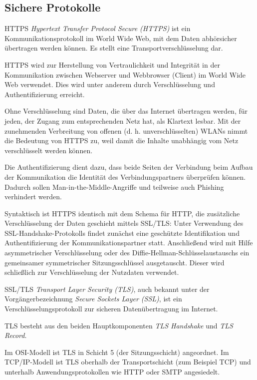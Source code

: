 \subsection{Sichere Protokolle}

\begin{defi}{HTTPS}
    \emph{Hypertext Transfer Protocol Secure (HTTPS)}  ist ein Kommunikationsprotokoll im World Wide Web, mit dem Daten abhörsicher übertragen werden können. Es stellt eine Transportverschlüsselung dar.

    HTTPS wird zur Herstellung von Vertraulichkeit und Integrität in der Kommunikation zwischen Webserver und Webbrowser (Client) im World Wide Web verwendet.
    Dies wird unter anderem durch Verschlüsselung und Authentifizierung erreicht.

    Ohne Verschlüsselung sind Daten, die über das Internet übertragen werden, für jeden, der Zugang zum entsprechenden Netz hat, als Klartext lesbar.
    Mit der zunehmenden Verbreitung von offenen (d. h. unverschlüsselten) WLANs nimmt die Bedeutung von HTTPS zu, weil damit die Inhalte unabhängig vom Netz verschlüsselt werden können.

    Die Authentifizierung dient dazu, dass beide Seiten der Verbindung beim Aufbau der Kommunikation die Identität des Verbindungspartners überprüfen können.
    Dadurch sollen Man-in-the-Middle-Angriffe und teilweise auch Phishing verhindert werden.

    Syntaktisch ist HTTPS identisch mit dem Schema für HTTP, die zusätzliche Verschlüsselung der Daten geschieht mittels SSL/TLS: Unter Verwendung des SSL-Handshake-Protokolls findet zunächst eine geschützte Identifikation und Authentifizierung der Kommunikationspartner statt. Anschließend wird mit Hilfe asymmetrischer Verschlüsselung oder des Diffie-Hellman-Schlüsselaustauschs ein gemeinsamer symmetrischer Sitzungsschlüssel ausgetauscht.
    Dieser wird schließlich zur Verschlüsselung der Nutzdaten verwendet.
\end{defi}

\begin{defi}{SSL/TLS}
    \emph{Transport Layer Security (TLS)}, auch bekannt unter der Vorgängerbezeichnung \emph{Secure Sockets Layer (SSL)}, ist ein Verschlüsselungsprotokoll zur sicheren Datenübertragung im Internet.

    TLS besteht aus den beiden Hauptkomponenten \emph{TLS Handshake} und \emph{TLS Record}.

    Im OSI-Modell ist TLS in Schicht 5 (der Sitzungsschicht) angeordnet.
    Im TCP/IP-Modell ist TLS oberhalb der Transportschicht (zum Beispiel TCP) und unterhalb Anwendungsprotokollen wie HTTP oder SMTP angesiedelt.
\end{defi}

